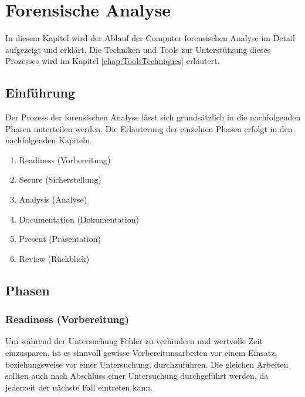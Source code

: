 \chapter{Forensische Analyse}
In diesem Kapitel wird der Ablauf der Computer forensischen Analyse im Detail aufgezeigt und erklärt. Die Techniken und Tools zur Unterstützung dieses Prozesses wird im Kapitel \ref{chap:ToolsTechniques}  erläutert.



\section{Einführung}
Der Prozess der forensischen Analyse lässt sich grundsätzlich in die nachfolgenden Phasen unterteilen werden. Die Erläuterung der einzelnen Phasen erfolgt in den nachfolgenden Kapiteln.

\begin{enumerate}
\item Readiness (Vorbereitung)
\item Secure (Sicherstellung)
\item Analysis (Analyse)
\item Documentation (Dokumentation)
\item Present (Präsentation)
\item Review (Rückblick)
\end{enumerate}

\section{Phasen}
\subsection{Readiness (Vorbereitung)}
Um während der Untersuchung Fehler zu verhindern und wertvolle Zeit einzusparen, ist es sinnvoll gewisse Vorbereitunsarbeiten vor einem Einsatz, beziehungsweise vor einer Untersuchung, durchzuführen. Die gleichen Arbeiten sollten auch nach Abschluss einer Untersuchung durchgeführt werden, da jederzeit der nächste Fall eintreten kann.

